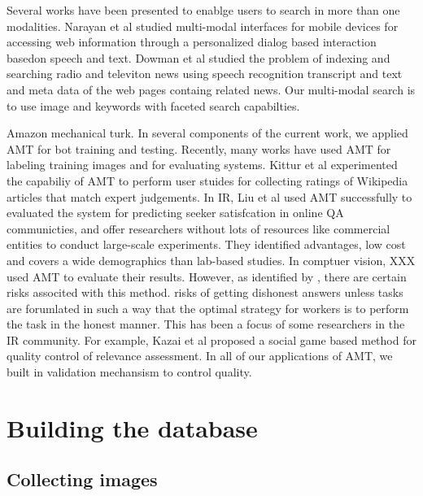\documentclass{www2010-submission}
\begin{document}
Several works have been presented to enablge users to search in more
than one modalities. Narayan et al \cite{Narayan} studied multi-modal
interfaces for mobile devices for accessing web information through a 
personalized dialog based interaction basedon speech and text. 
Dowman et al \cite{Dowman} studied the problem of indexing and
searching radio and televiton news using speech recognition transcript and text
and meta data of the web pages containg related news. Our multi-modal
search is to use image and keywords with faceted search capabilties.

Amazon mechanical turk. In several components of the current work, we
applied AMT for bot training and testing.  Recently, many works have
used AMT for labeling training images and for evaluating
systems. Kittur et al \cite{Kittur} experimented the capabiliy of AMT
to perform user stuides for collecting ratings of Wikipedia articles
that match expert judgements.  In IR, Liu et al \cite{Liu} used AMT
successfully to evaluated the system for predicting seeker
satisfcation in online QA communicties, and offer researchers without
lots of resources like commercial entities to conduct large-scale
experiments.  They identified advantages, low cost and covers a wide
demographics than lab-based studies.  In comptuer vision, XXX used AMT
to evaluate their results. However, as identified by \cite{Liu}, there
are certain risks associted with this method.  risks of getting
dishonest answers unless tasks are forumlated in such a way that the
optimal strategy for workers is to perform the task in the honest
manner. This has been a focus of some researchers in the IR
community. For example, Kazai et al \cite{Kazai} proposed a social
game based method for quality control of relevance assessment. In
all of our applications of AMT, we built in validation 
mechansism to control quality.

\section{Building the database}

\subsection{Collecting images}

\end{document}
